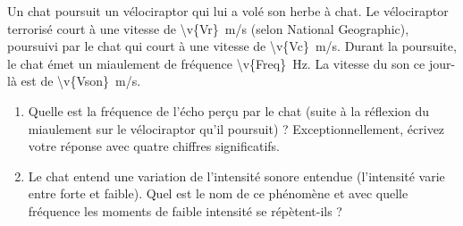 
Un chat poursuit un vélociraptor qui lui a volé son herbe à chat. Le vélociraptor terrorisé court à une vitesse de \qty{\v{Vr}}{m/s} (selon National Geographic), poursuivi par le chat qui court à une vitesse de \qty{\v{Vc}}{m/s}. Durant la poursuite, le chat émet un miaulement de fréquence \qty{\v{Freq}}{Hz}. La vitesse du son ce jour-là est de \qty{\v{Vson}}{m/s}.

\begin{enumerate}[label=\alph*)]
    \item Quelle est la fréquence de l'écho perçu par le chat (suite à la réflexion du miaulement sur le vélociraptor qu'il poursuit) ? Exceptionnellement, écrivez votre réponse avec quatre chiffres significatifs.
    \item Le chat entend une variation de l'intensité sonore entendue (l'intensité varie entre forte et faible). Quel est le nom de ce phénomène et avec quelle fréquence les moments de faible intensité se répètent-ils ?
\end{enumerate}

\vspace{0.4cm}